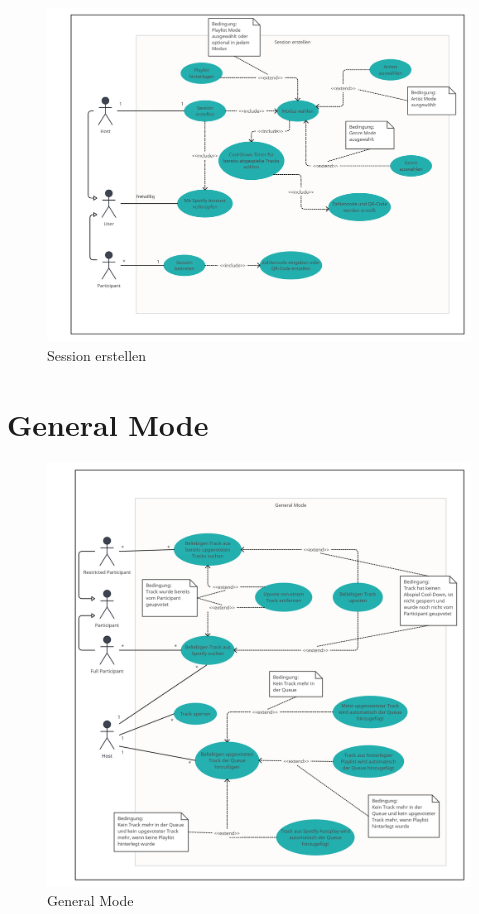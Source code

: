 \documentclass[oneside, ngerman]{sdqtechreport}
\begin{document}
\begin{figure}[h]
   \hypertarget{Anwendungsfaelle}{}
    \includegraphics[width = 16cm]{LATEX/Pflichtenheft/GraphicDesigns/Use Case Session erstellen.png}
    \caption{Session erstellen}
    \label{fig:Use Case App Start}
\end{figure}

\newpage

\section{General Mode}
\label{sec:Anwendungsfälle:General Mode}

\begin{figure}[h]
    \includegraphics[width = 16cm]{LATEX/Pflichtenheft/GraphicDesigns/Use Case General Mode.png}
    \caption{General Mode}
    \label{fig:Use Case General Mode}
\end{figure}
\end{document}
